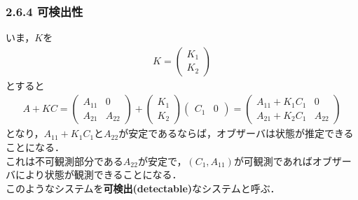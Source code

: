 \begin{frame}[t]
\frametitle{2.6.4 可検出性}
いま，$K$を
\begin{align}
	K=
	\left(	\begin{array}{c}
			K_1 \\
			K_2
		\end{array} \right)
\end{align}
とすると
\begin{align}
	A+KC= 
	  \left(\begin{array}{cc}
        	{A}_{11} & 0 \\
	     	{A}_{21} & {A}_{22}
		\end{array}\right)
	+ \left(\begin{array}{c}
			K_1 \\
			K_2
		\end{array} \right)
	  \left(\begin{array}{cc}
	         {C}_1 & 0
		\end{array}\right)
	=\left(\begin{array}{cc}
        	{A}_{11} + K_1 C_1 & 0 \\
	     	{A}_{21} + K_2 C_1& {A}_{22}
		\end{array}\right)
\end{align}
となり，$A_{11}+ K_1 C_1$と$A_{22}$が安定であるならば，オブザーバは状態が推定できることになる．
\\[3mm]

これは不可観測部分である$A_{22}$が安定で，$(C_1, A_{11})$が可観測であればオブザーバにより状態が観測できることになる．
\\[3mm]

このようなシステムを{\bf 可検出(detectable)}なシステムと呼ぶ．
\end{frame}

